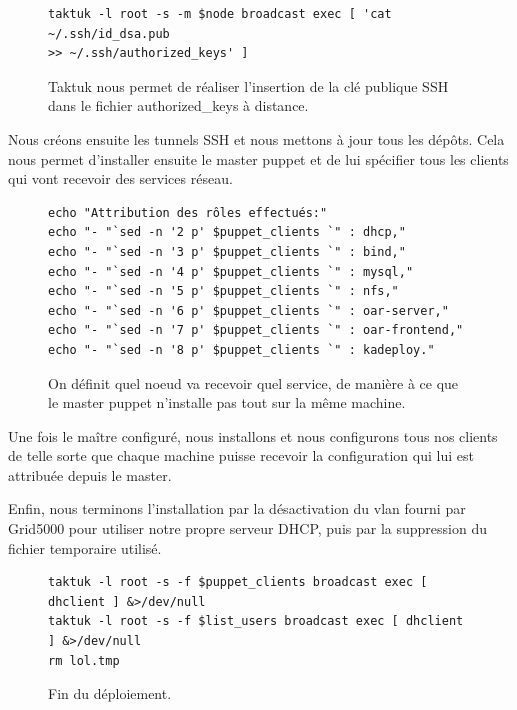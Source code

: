 \documentclass[a4paper,10pt]{article}
\begin{document}
		\begin{figure}[!h]
			\centering
			\begin{verbatim}			 
taktuk -l root -s -m $node broadcast exec [ 'cat ~/.ssh/id_dsa.pub 
>> ~/.ssh/authorized_keys' ]	
			\end{verbatim}
			\caption{Taktuk nous permet de réaliser l'insertion de la clé publique SSH dans le fichier authorized\_keys à distance.}
			\label{taktuk}
		\end{figure}
		Nous créons ensuite les tunnels SSH et nous mettons à jour tous les dépôts. Cela nous permet d'installer 
ensuite le master puppet et de lui spécifier tous les clients qui vont recevoir des services réseau.		
		\begin{figure}[!h]
			\centering
			\begin{verbatim}			 
echo "Attribution des rôles effectués:"
echo "- "`sed -n '2 p' $puppet_clients `" : dhcp,"
echo "- "`sed -n '3 p' $puppet_clients `" : bind,"
echo "- "`sed -n '4 p' $puppet_clients `" : mysql,"
echo "- "`sed -n '5 p' $puppet_clients `" : nfs,"
echo "- "`sed -n '6 p' $puppet_clients `" : oar-server,"
echo "- "`sed -n '7 p' $puppet_clients `" : oar-frontend,"
echo "- "`sed -n '8 p' $puppet_clients `" : kadeploy." 
			\end{verbatim}
			\caption{On définit quel noeud va recevoir quel service, de manière à ce que le master puppet n'installe pas tout sur la m\^eme machine.}
			\label{installPuppet}
		\end{figure}
		Une fois le ma\^itre configuré, nous installons et nous configurons tous nos clients de telle sorte que chaque machine puisse recevoir la configuration qui lui est attribuée depuis le master.
		
		Enfin, nous terminons l'installation par la désactivation du vlan fourni par Grid5000 pour utiliser notre propre serveur DHCP, puis par la suppression du fichier temporaire utilisé.		
		\begin{figure}[!h]
			\centering
			\begin{verbatim}			 
taktuk -l root -s -f $puppet_clients broadcast exec [ dhclient ] &>/dev/null
taktuk -l root -s -f $list_users broadcast exec [ dhclient ] &>/dev/null
rm lol.tmp		
			\end{verbatim}
			\caption{Fin du déploiement.}
			\label{fin}
		\end{figure}	
		
\end{document}
